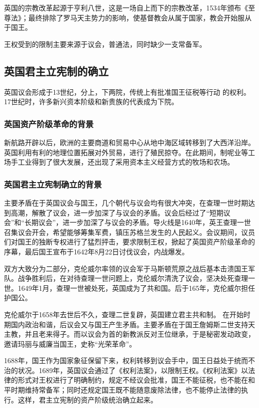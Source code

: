 英国的宗教改革起源于亨利八世，这是一场自上而下的宗教改革，1534年颁布《至尊法》；最终排除了罗马天主势力的影响，使基督教会从属于国家，教会开始服从于国王。

王权受到的限制主要来源于议会，普通法，同时缺少一支常备军。

\subsection{英国君主立宪制的确立}
英国议会形成于13世纪，分上，下两院，传统上有批准国王征税等行动 的权利。17世纪时，许多新兴资本阶级和新贵族的代表成为下院。

\subsubsection{英国资产阶级革命的背景}
新航路开辟以后，欧洲的主要商道和贸易中心从地中海区域转移到了大西洋沿岸。英国利用有利的地理位置拓展对外贸易，进行了殖民掠夺。在此期间，制呢业等工场手工业得到了很大发展，还出现了采用资本主义经营方式的牧场和农场。

\subsubsection{英国君主立宪制确立的背景}
主要矛盾在于英国议会与国王，几个朝代与议会均有很大冲突，在查理一世时期达到高潮，解散了议会，进一步加深了与议会的矛盾。议会后经过了“短期议会”和“长期议会”，进一步加深了与议会的矛盾。导火线是1640年，英王查理一世召集议会开会，希望能够筹集军费，镇压苏格兰发生的人民起义。会议期间，议员们对国王的独断专权进行了猛烈抨击，要求限制王权，掀起了英国资产阶级革命的序幕，最后国王宣布于1642年8月22日讨伐议会，内战爆发。

双方大致分为二部分，克伦威尔率领的议会军于马斯顿荒原之战后基本击溃国王军队。战争胜利后，在对待查理一世问题上，克伦威尔清洗了议会，坚决处死查理一世。1649年1月，查理一世被处死，英国成为了共和国。后于165年，克伦威尔担任护国公。

克伦威尔于1658年去世后不久，查理二世复辟，英国建立君主共和制。
在开始时期国内政治和谐，后议会又与国王产生矛盾。主要矛盾在于国王詹姆斯二世支持天主教，并且老来得子。而以议会为首的新教派反对王位继承，于是秘密发动政变，邀请玛丽与威廉当国王，史称“光荣革命”。

1688年，国王作为国家象征保留下来，权利转移到议会手中，国王日益处于统而不治的状况。1689年，英国议会通过了《权利法案》，以限制王权。《权利法案》以法律的形式对王权进行了明确制约，规定不经议会批准，国王不能征税，也不能在和平时期维持常备军；同时还规定国王既不能随意废除法律，也不能停止法律的执行。这样，君主立宪制的资产阶级统治确立起来。

